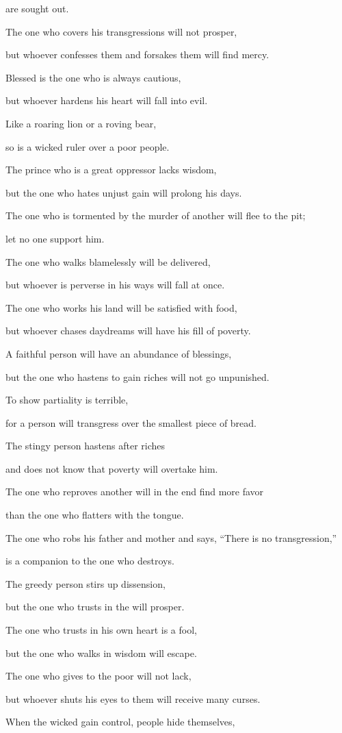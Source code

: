 {are sought out.
\par }{\Q {}The one who covers
his transgressions
will not
prosper,
\par }{\Q but
whoever confesses
them and forsakes
them will find mercy.
\par }{\Q {}Blessed
is the one
who is always
cautious,
\par }{\Q but whoever hardens
his heart
will fall
into evil.
\par }{\Q {}Like a roaring lion
or a roving
bear,
\par }{\Q so
is a wicked
ruler
over
a poor
people.
\par }{\Q {}The prince
who is a great
oppressor
lacks
wisdom,
\par }{\Q but the one who hates
unjust gain
will prolong
his days.
\par }{\Q {}The one
who is tormented
by the murder
of another will flee
to the pit;
\par }{\Q let no
one support him.
\par }{\Q {}The one
who walks
blamelessly
will be delivered,
\par }{\Q but whoever is perverse
in his ways
will fall
at once.
\par }{\Q {}The one who
works
his land
will be satisfied
with food,
\par }{\Q but whoever chases
daydreams
will have his fill
of poverty.
\par }{\Q {}A faithful
person
will have an abundance
of blessings,
\par }{\Q but the one who hastens
to gain riches
will not
go unpunished.
\par }{\Q {}To show partiality
is terrible,
\par }{\Q for a person will transgress
over
the smallest piece
of bread.
\par }{\Q {}The stingy person
hastens
after riches
\par }{\Q and does not
know
that
poverty
will overtake him.
\par }{\Q {}The one who reproves
another
will in the end
find
more favor
\par }{\Q than the one who flatters
with the tongue.
\par }{\Q {}The one who robs
his father
and mother
and says,
“There is no
transgression,”
\par }{\Q is a companion
to the one
who destroys.
\par }{\Q {}The greedy
person
stirs
up dissension,
\par }{\Q but the one who trusts
in the
{}
will prosper.
\par }{\Q {}The one who trusts
in his own heart
is
a fool,
\par }{\Q but the one who walks
in wisdom
will escape.
\par }{\Q {}The one who gives
to the poor
will not
lack,
\par }{\Q but whoever shuts
his eyes
to them will receive many
curses.
\par }{\Q {}When the wicked
gain control,
people
hide
themselves,

}
